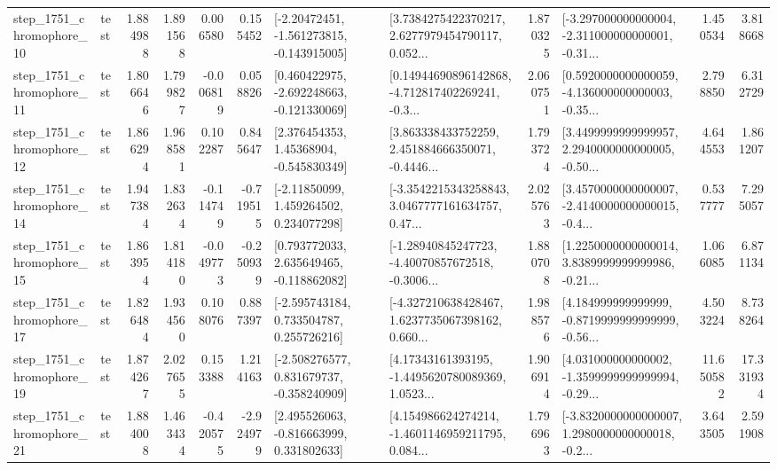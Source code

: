 \begin{tabular}{llrrrrllrlrr}
 step\_1751\_chromophore\_10 &      test &      1.884988 &    1.891568 &      0.006580 &  0.155452 &   [-2.20472451, -1.561273815, -0.143915005] &  [3.7384275422370217, 2.6277979454790117, 0.052... &       1.870325 &  [-3.297000000000004, -2.311000000000001, -0.31... &            1.450534 &          3.818668 \\
 step\_1751\_chromophore\_11 &      test &      1.806646 &    1.799827 &     -0.006819 &  0.058826 &   [0.460422975, -2.692248663, -0.121330069] &  [0.14944690896142868, -4.712817402269241, -0.3... &       2.060751 &  [0.5920000000000059, -4.136000000000003, -0.35... &            2.798850 &          6.312729 \\
 step\_1751\_chromophore\_12 &      test &      1.866294 &    1.968581 &      0.102287 &  0.845647 &     [2.376454353, 1.45368904, -0.545830349] &  [3.863338433752259, 2.451884666350071, -0.4446... &       1.793724 &  [3.4499999999999957, 2.2940000000000005, -0.50... &            4.644553 &          1.861207 \\
 step\_1751\_chromophore\_14 &      test &      1.947384 &    1.832634 &     -0.114749 & -0.719515 &     [-2.11850099, 1.459264502, 0.234077298] &  [-3.3542215343258843, 3.0467777161634757, 0.47... &       2.025763 &  [3.4570000000000007, -2.4140000000000015, -0.4... &            0.537777 &          7.295057 \\
 step\_1751\_chromophore\_15 &      test &      1.863954 &    1.814180 &     -0.049773 & -0.250939 &    [0.793772033, 2.635649465, -0.118862082] &  [-1.28940845247723, -4.40070857672518, -0.3006... &       1.880708 &  [1.2250000000000014, 3.8389999999999986, -0.21... &            1.066085 &          6.871134 \\
 step\_1751\_chromophore\_17 &      test &      1.826484 &    1.934560 &      0.108076 &  0.887397 &    [-2.595743184, 0.733504787, 0.255726216] &  [-4.327210638428467, 1.6237735067398162, 0.660... &       1.988576 &  [4.184999999999999, -0.8719999999999999, -0.56... &            4.503224 &          8.738264 \\
 step\_1751\_chromophore\_19 &      test &      1.874267 &    2.027655 &      0.153388 &  1.214163 &   [-2.508276577, 0.831679737, -0.358240909] &  [4.17343161393195, -1.4495620780089369, 1.0523... &       1.906914 &  [4.031000000000002, -1.3599999999999994, -0.29... &           11.650582 &         17.331934 \\
 step\_1751\_chromophore\_21 &      test &      1.884008 &    1.463434 &     -0.420575 & -2.924979 &    [2.495526063, -0.816663999, 0.331802633] &  [4.154986624274214, -1.4601146959211795, 0.084... &       1.796963 &  [-3.8320000000000007, 1.2980000000000018, -0.2... &            3.643505 &          2.591908 \\

\end{tabular}
